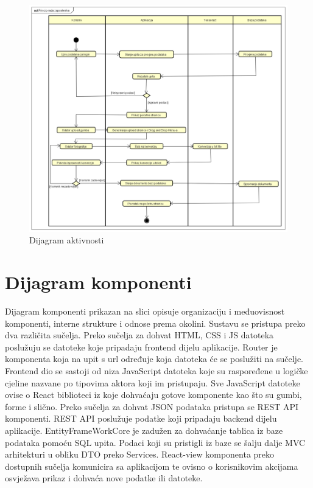 			\begin{figure}[H]
				\includegraphics[scale=0.4]{slike/dijagram_aktivnosti.png} %
				\centering
				\caption{Dijagram aktivnosti}
				\label{fig:promjene}
			\end{figure}


			\eject
		\section{Dijagram komponenti}
		
			
			 Dijagram komponenti prikazan na slici opisuje organizaciju i međuovisnost komponenti, interne strukture i odnose prema okolini. Sustavu se pristupa preko dva različita sučelja. Preko sučelja za dohvat HTML, CSS i JS datoteka poslužuju se datoteke koje pripadaju frontend dijelu aplikacije. Router je komponenta koja na upit s url određuje koja datoteka će se poslužiti na sučelje. Frontend dio se sastoji od niza JavaScript datoteka koje su raspoređene u logičke cjeline nazvane po tipovima aktora koji im pristupaju. Sve JavaScript datoteke ovise o React biblioteci iz koje dohvaćaju gotove komponente kao što su gumbi, forme i slično. Preko sučelja za dohvat JSON podataka pristupa se REST API komponenti. REST API poslužuje podatke koji pripadaju backend dijelu aplikacije. EntityFrameWorkCore je zadužen za dohvaćanje tablica iz baze podataka pomoću SQL upita. Podaci koji su pristigli iz baze se šalju dalje MVC arhitekturi u obliku DTO preko Services. React-view komponenta preko dostupnih sučelja komunicira sa aplikacijom te ovisno o korisnikovim akcijama osvježava prikaz i dohvaća nove podatke ili datoteke.

